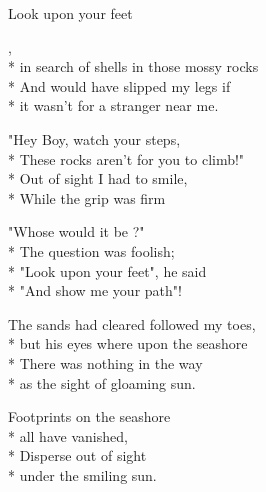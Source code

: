 \documentclass[a4paper]{article}
\begin{document}
\maketitle
\begin{poem}{Look upon your feet}{}
\settowidth{\versewidth}{}

\begin{altverse}
,\\*
in search of shells in those mossy rocks\\*
And would have slipped my legs if\\*
it wasn't for a stranger near me.
\end{altverse}

\begin{altverse}
"Hey Boy, watch your steps,\\*
These rocks aren't for you to climb!"\\*
Out of sight I had to smile,\\*
While the grip was firm
\end{altverse}

\begin{altverse}
"Whose would it be ?"\\*
The question was foolish;\\*
"Look upon your feet", he said\\*
"And show me your path"!
\end{altverse}

\begin{altverse}
The sands had cleared followed my toes,\\*
but his eyes where upon the seashore\\*
There was nothing in the way\\*
as the sight of gloaming sun.
\end{altverse}

\begin{altverse}
Footprints on the seashore\\*
all have vanished,\\*
Disperse out of sight\\*
under the smiling sun.
\end{altverse}


\end{poem}
\end{document}
